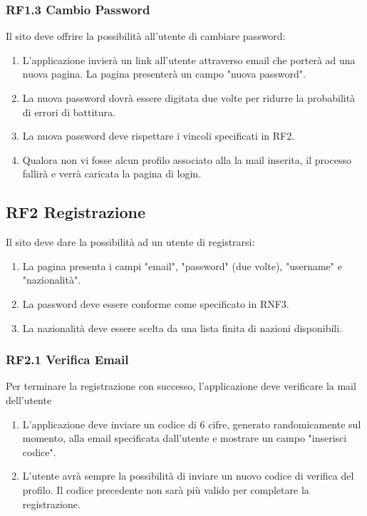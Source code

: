 \documentclass{report}
\begin{document}
\subsubsection*{RF1.3 Cambio Password}
Il sito deve offrire la possibilità all’utente di cambiare password:
	\begin{enumerate}
		\item L'applicazione invierà un link all'utente attraverso email che porterà ad una nuova pagina. La pagina presenterà un campo "nuova password".
		
		\item La nuova password dovrà essere digitata due volte per ridurre la probabilità di errori di battitura.
		
		\item La nuova password deve rispettare i vincoli specificati in RF2.
		
		\item Qualora non vi fosse alcun profilo associato alla la mail inserita, il processo fallirà e verrà caricata la pagina di login.
	\end{enumerate}


\subsection*{RF2 Registrazione}
Il sito deve dare la possibilità ad un utente di registrarsi:
\begin{enumerate}
	\item La pagina presenta i campi "email", "password" (due volte), "username" e "nazionalità". 
	\item La password deve essere conforme come specificato in RNF3.
	\item La nazionalità deve essere scelta da una lista finita di nazioni disponibili.
\end{enumerate}

\subsubsection*{RF2.1 Verifica Email}
Per terminare la registrazione con successo, l'applicazione deve verificare la mail dell'utente

\begin{enumerate}
	\item L'applicazione deve inviare un codice di 6 cifre, generato randomicamente sul momento, alla email specificata dall’utente e mostrare un campo "inserisci codice".
		
	\item L’utente avrà sempre la possibilità di inviare un nuovo codice di verifica del profilo. Il codice precedente non sarà più valido per completare la registrazione.
		
\end{enumerate}
\end{document}
